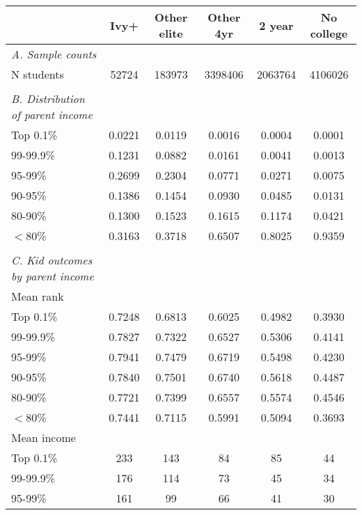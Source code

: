 \begin{tabular}{l*{5}{c}}
\toprule
 & Ivy+ & Other elite & Other 4yr & 2 year & No college\\
\midrule
\emph{A. Sample counts} \\
N students&        52724&       183973&      3398406&      2063764&      4106026\\\\
\emph{B. Distribution of parent income} \\
Top 0.1\% & 0.0221 & 0.0119 & 0.0016 & 0.0004 & 0.0001\\
99-99.9\% & 0.1231 & 0.0882 & 0.0161 & 0.0041 & 0.0013\\
95-99\% & 0.2699 & 0.2304 & 0.0771 & 0.0271 & 0.0075\\
90-95\% & 0.1386 & 0.1454 & 0.0930 & 0.0485 & 0.0131\\
80-90\% & 0.1300 & 0.1523 & 0.1615 & 0.1174 & 0.0421\\
$<$80\% & 0.3163 & 0.3718 & 0.6507 & 0.8025 & 0.9359\\\\
\emph{C. Kid outcomes by parent income} \\
Mean rank \\
\hspace{3mm} Top 0.1\% & 0.7248 & 0.6813 & 0.6025 & 0.4982 & 0.3930\\
\hspace{3mm} 99-99.9\% & 0.7827 & 0.7322 & 0.6527 & 0.5306 & 0.4141\\
\hspace{3mm} 95-99\% & 0.7941 & 0.7479 & 0.6719 & 0.5498 & 0.4230\\
\hspace{3mm} 90-95\% & 0.7840 & 0.7501 & 0.6740 & 0.5618 & 0.4487\\
\hspace{3mm} 80-90\% & 0.7721 & 0.7399 & 0.6557 & 0.5574 & 0.4546\\
\hspace{3mm} $<$80\% & 0.7441 & 0.7115 & 0.5991 & 0.5094 & 0.3693\\
Mean income \\
\hspace{3mm} Top 0.1\% &  233 &  143 &   84 &   85 &   44\\
\hspace{3mm} 99-99.9\% &  176 &  114 &   73 &   45 &   34\\
\hspace{3mm} 95-99\% &  161 &   99 &   66 &   41 &   30\\

\end{tabular}
